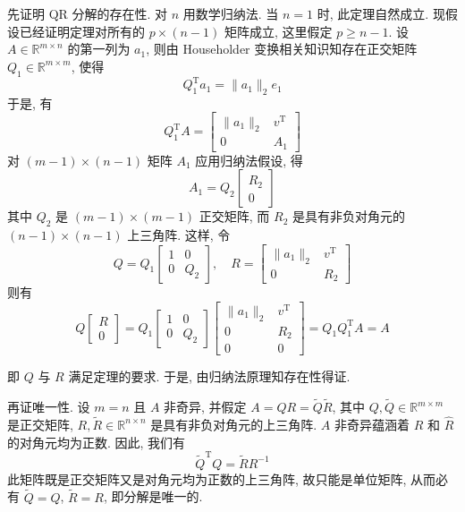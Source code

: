 \documentclass[12pt, answers]{exam}     %
\newcommand{\R}{\mathbb{R}}
\newcommand{\T}{\mathrm{T}}
\begin{document}
\begin{questions}
\begin{solution}
先证明 QR 分解的存在性. 对 \( n \) 用数学归纳法. 当 \( n = 1 \) 时, 此定理自然成立. 现假设已经证明定理对所有的 \( p \times (n-1) \) 矩阵成立, 这里假定 \( p \geq n-1 \). 
设 \( A \in \R^{m \times n} \) 的第一列为 \( a_1 \), 则由 Householder 变换相关知识知存在正交矩阵 \( Q_1 \in \R^{m \times m} \), 使得
\[
Q_1^{\T} a_1 = \|a_1\|_2 e_1 
\]
于是, 有
\[
Q_1^{\T} A = 
\begin{bmatrix}
\|a_1\|_2 & v^{\T} \\
0 & A_1
\end{bmatrix}
\]
对 \( (m-1) \times (n-1) \) 矩阵 \( A_1 \) 应用归纳法假设, 得
\[
A_1 = Q_2 
\begin{bmatrix}
R_2 \\
0
\end{bmatrix}
\]
其中 \( Q_2 \) 是 \( (m-1) \times (m-1) \) 正交矩阵, 而 \( R_2 \) 是具有非负对角元的 \( (n-1) \times (n-1) \) 上三角阵. 这样, 令
\[
Q = Q_1 
\begin{bmatrix}
1 & 0 \\
0 & Q_2
\end{bmatrix}, \quad
R = 
\begin{bmatrix}
\|a_1\|_2 & v^{\T} \\
0 & R_2 
\end{bmatrix}
\]
则有
\[
Q \begin{bmatrix} R \\ 0 \end{bmatrix} = 
Q_1 \begin{bmatrix} 1 & 0 \\ 0 & Q_2 \end{bmatrix} \begin{bmatrix} \|a_1\|_2 & v^{\T} \\ 0 & R_2 \\ 0 & 0 \end{bmatrix}
= Q_1 Q_1^{\T} A = A
\]

即 \( Q \) 与 \( R \) 满足定理的要求. 于是, 由归纳法原理知存在性得证. 

再证唯一性. 设 \( m = n \) 且 \( A \) 非奇异, 并假定 \( A = QR = \tilde{Q}\tilde{R} \), 其中 \( Q, \tilde{Q} \in \R^{m \times m} \) 是正交矩阵, 
\( R, \tilde{R} \in \R^{n \times n} \) 是具有非负对角元的上三角阵. \( A \) 非奇异蕴涵着 \( R \) 和 \( \hat{R} \) 的对角元均为正数. 因此, 我们有
\[
\tilde{Q}^{\T} Q = \tilde{R} R^{-1}
\]
此矩阵既是正交矩阵又是对角元均为正数的上三角阵, 故只能是单位矩阵, 从而必有 \( \tilde{Q} = Q \), \( \tilde{R} = R \), 即分解是唯一的. 
\end{solution}  


\end{questions}
\end{document}
